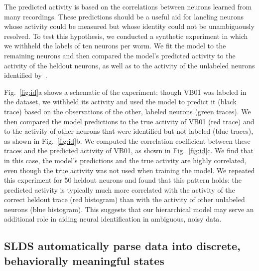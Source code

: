 \documentclass[11pt]{article}
\begin{document}
The predicted activity is based on the correlations between neurons
learned from many recordings.  These predictions should be a useful
aid for laneling neurons whose activity could be measured but whose
identity could not be unambiguously resolved.  To test this
hypothesis, we conducted a synthetic experiment in which we withheld
the labels of ten neurons per worm.  We fit the model to the remaining
neurons and then compared the model's predicted activity to the
activity of the heldout neurons, as well as to the activity of the
unlabeled neurons identified by~\citet{kato2015global}.

Fig.~\ref{fig:id}a shows a schematic of the experiment: though VB01
was labeled in the dataset, we withheld its activity and used the
model to predict it (black trace) based on the observations of the
other, labeled neurons (green traces).  We then compared the model
predictions to the true activity of VB01 (red trace) and to the
activity of other neurons that were identified but not labeled (blue
traces), as shown in Fig.~\ref{fig:id}b.  We computed the correlation
coefficient between these traces and the predicted activity of VB01,
as shown in Fig.~\ref{fig:id}c.
We find that in this case, the model's predictions and the true activity
are highly correlated, even though the true activity was not used
when training the model.  We repeated this experiment for 50 heldout
neurons and found that this pattern holds: the predicted activity is
typically much more correlated with the activity of the correct
heldout trace (red histogram) than with the activity of other unlabeled
neurons (blue histogram).  This suggests that our hierarchical model
may serve an additional role in aiding neural identification in
ambiguous, noisy data. 



\subsection*{SLDS automatically parse data into discrete, behaviorally meaningful states}
\end{document}
